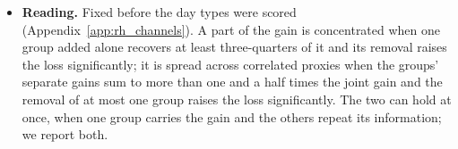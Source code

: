 \begin{itemize}
\begin{itemize}
    \citet{MaischZhangUlrichZimmer2026} (Table~\ref{tab:rh_channels_sparse}; Appendix~\ref{app:rh_fi_ladder}); and a
    factor-augmented HAR \citep{StockWatson2002,KellyPruitt2015} on ordinary days (Table~\ref{tab:rh_factor}).
  \item Use: each model's attribution, its TreeSHAP shares \citep{lundberg2020local} or standardized coefficient
    shares (Appendices~\ref{app:rh_fi_compute} and~\ref{app:rh_fi_rank}). A share measures how much a series moves
    the forecast, not how much it improves it.
  \end{itemize}
\item \textbf{Reading.} Fixed before the day types were scored (Appendix~\ref{app:rh_channels}). A part of the gain is
  concentrated when one group added alone recovers at least three-quarters of it and its removal raises the loss
  significantly; it is spread across correlated proxies when the groups' separate gains sum to more than one and a
  half times the joint gain and the removal of at most one group raises the loss significantly. The two can hold at
  once, when one group carries the gain and the others repeat its information; we report both.
\end{itemize}

